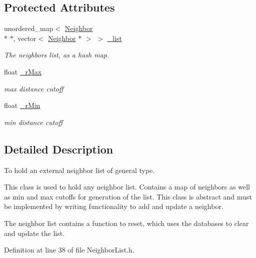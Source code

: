 \subsection*{Protected Attributes}
\begin{DoxyCompactItemize}
\item 
unordered\+\_\+map$<$ \hyperlink{classNeighbor}{Neighbor} \\*
$\ast$, vector$<$ \hyperlink{classNeighbor}{Neighbor} $\ast$ $>$ $>$ \hyperlink{classNeighborList_af09da5281bc352cf028e39276ba5b68f}{\+\_\+list}
\begin{DoxyCompactList}\small\item\em The neighbors list, as a hash map. \end{DoxyCompactList}\item 
float \hyperlink{classNeighborList_a94d5215ec2f93c2191cd0ca87e062c5e}{\+\_\+r\+Max}
\begin{DoxyCompactList}\small\item\em max distance cutoff \end{DoxyCompactList}\item 
float \hyperlink{classNeighborList_a5fc2a03a950ca3867920527410ee8aa0}{\+\_\+r\+Min}
\begin{DoxyCompactList}\small\item\em min distance cutoff \end{DoxyCompactList}\end{DoxyCompactItemize}


\subsection{Detailed Description}
To hold an external neighbor list of general type. 

This class is used to hold any neighbor list. Contains a map of neighbors as well as min and max cutoffs for generation of the list. This class is abstract and must be implemented by writing functionality to add and update a neighbor.

The neighbor list contains a function to reset, which uses the databases to clear and update the list. 

Definition at line 38 of file Neighbor\+List.\+h.



